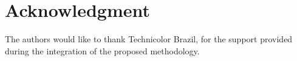 \documentclass[conference]{IEEEtran}
\begin{document}


\section*{Acknowledgment}

The authors would like to thank Technicolor Brazil, for the support provided during the integration of the proposed methodology.






\end{document}
